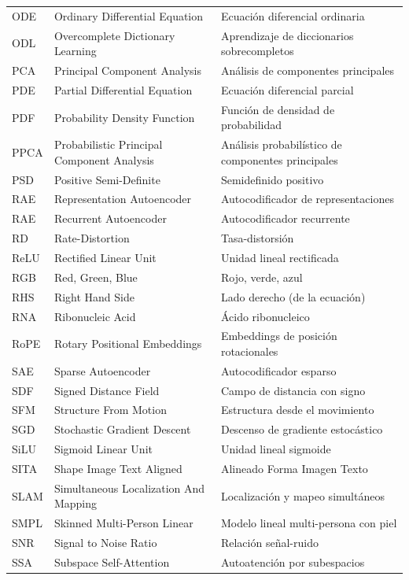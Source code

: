 \documentclass[../book-main_es.tex]{subfiles}
\begin{document}
\begin{longtable}{@{} p{} @{\hspace{1em}} p{} @{\hspace{1em}} p{}}
ODE & Ordinary Differential Equation & Ecuación diferencial ordinaria \\
ODL & Overcomplete Dictionary Learning & Aprendizaje de diccionarios sobrecompletos \\
PCA & Principal Component Analysis & Análisis de componentes principales \\
PDE & Partial Differential Equation & Ecuación diferencial parcial \\
PDF & Probability Density Function & Función de densidad de probabilidad \\
PPCA & Probabilistic Principal Component Analysis & Análisis probabilístico de componentes principales \\
PSD & Positive Semi-Definite & Semidefinido positivo \\
RAE & Representation Autoencoder & Autocodificador de representaciones \\
RAE & Recurrent Autoencoder & Autocodificador recurrente \\
RD & Rate-Distortion & Tasa-distorsión \\
ReLU & Rectified Linear Unit & Unidad lineal rectificada \\
RGB & Red, Green, Blue & Rojo, verde, azul \\
RHS & Right Hand Side & Lado derecho (de la ecuación) \\
RNA & Ribonucleic Acid & Ácido ribonucleico \\
RoPE & Rotary Positional Embeddings  & Embeddings de posición rotacionales \\
SAE & Sparse Autoencoder  & Autocodificador esparso \\
SDF & Signed Distance Field & Campo de distancia con signo \\
SFM & Structure From Motion & Estructura desde el movimiento \\
SGD & Stochastic Gradient Descent & Descenso de gradiente estocástico \\
SiLU & Sigmoid Linear Unit & Unidad lineal sigmoide \\
SITA & Shape Image Text Aligned & Alineado Forma Imagen Texto \\
SLAM & Simultaneous Localization And Mapping & Localización y mapeo simultáneos \\
SMPL & Skinned Multi-Person Linear & Modelo lineal multi-persona con piel \\
SNR & Signal to Noise Ratio & Relación señal-ruido \\
SSA & Subspace Self-Attention & Autoatención por subespacios \\

\end{longtable}
\end{document}
